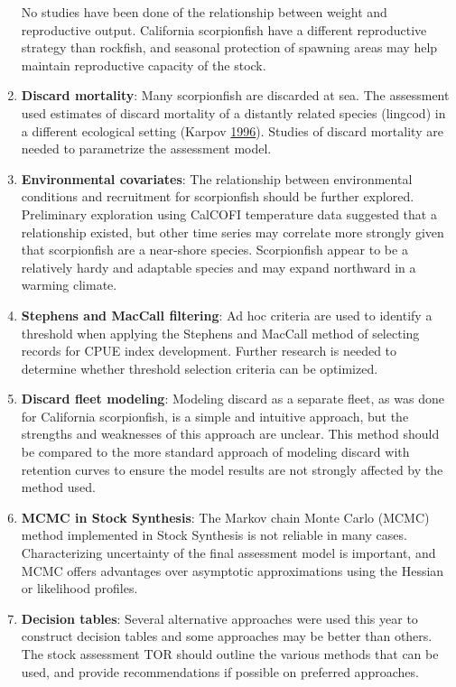 \documentclass[12pt,]{article}
\begin{document}
\begin{enumerate}
No studies have been done of the relationship between weight and reproductive 
output.  California scorpionfish have a different reproductive strategy than rockfish, 
and seasonal protection of spawning areas may help maintain reproductive capacity 
of the stock.

\item \textbf{Discard mortality}: Many scorpionfish are discarded at sea. The assessment 
used estimates of discard mortality of a distantly related species (lingcod) 
in a different ecological setting (Karpov \protect\hyperlink{ref-Karpov1996}{1996}). 
Studies of discard mortality are needed 
to parametrize the assessment model.

\item \textbf{Environmental covariates}: The relationship between environmental 
conditions and recruitment for scorpionfish should be further explored. Preliminary 
exploration using CalCOFI temperature data suggested that a relationship existed, 
but other time series may correlate more strongly given that scorpionfish are a 
near-shore species.  Scorpionfish appear to be a relatively hardy and adaptable 
species and may expand northward in a warming climate.  


\item \textbf{Stephens and MacCall filtering}: Ad hoc criteria are used to identify 
a threshold when applying the Stephens and MacCall method of selecting records for 
CPUE index development.  Further research is needed to determine whether threshold 
selection criteria can be optimized.


\item \textbf{Discard fleet modeling}: Modeling discard as a separate fleet, as 
was done for California scorpionfish, is a simple and intuitive approach, but 
the strengths and weaknesses of this approach are unclear. This method should 
be compared to the more standard approach of modeling discard with retention 
curves to ensure the model results are not strongly affected by the method used.


\item \textbf{MCMC in Stock Synthesis}: The Markov chain Monte Carlo (MCMC) 
method implemented in Stock Synthesis is not reliable in many cases.  
Characterizing uncertainty of the final assessment model is important, and 
MCMC offers advantages over asymptotic approximations using the Hessian or 
likelihood profiles. 

\item \textbf{Decision tables}: Several alternative approaches were used this 
year to construct decision tables and some approaches may be better than others. 
The stock assessment TOR should outline the various methods that can be used, 
and provide recommendations if possible on preferred approaches.



\end{enumerate}
\end{document}

